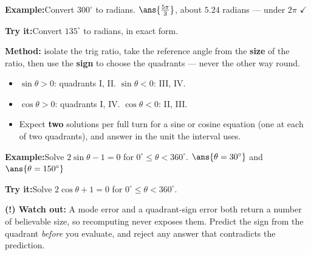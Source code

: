 \documentclass[12pt]{article}
\begin{document}
\begin{examplebox}
\textbf{Example:}\quad Convert $300^\circ$ to radians.
$\ans{\frac{5\pi}{3}}$, about $5.24$ radians --- under $2\pi$ $\checkmark$
\end{examplebox}

\begin{tryitbox}
\textbf{Try it:}\quad Convert $135^\circ$ to radians, in exact form.\\[2pt]
\end{tryitbox}


\begin{formulabox}
\textbf{Method:} isolate the trig ratio, take the reference angle from the
\textbf{size} of the ratio, then use the \textbf{sign} to choose the quadrants ---
never the other way round.
\begin{itemize}[leftmargin=0.8cm, itemsep=1pt, topsep=2pt]
  \item $\sin\theta > 0$: quadrants I, II. \quad $\sin\theta < 0$: III, IV.
  \item $\cos\theta > 0$: quadrants I, IV. \quad $\cos\theta < 0$: II, III.
  \item Expect \textbf{two} solutions per full turn for a sine or cosine equation
        (one at each of two quadrants), and answer in the unit the interval uses.
\end{itemize}
\end{formulabox}

\begin{examplebox}
\textbf{Example:}\quad Solve $2\sin\theta - 1 = 0$ for
$0^\circ \le \theta < 360^\circ$.
$\ans{\theta = 30^\circ}$ and $\ans{\theta = 150^\circ}$
\end{examplebox}

\begin{tryitbox}
\textbf{Try it:}\quad Solve $2\cos\theta + 1 = 0$ for
$0^\circ \le \theta < 360^\circ$.\\[2pt]
\end{tryitbox}

\begin{watchoutbox}
\textbf{(!) Watch out:} A mode error and a quadrant-sign error both return a
number of believable size, so recomputing never exposes them. Predict the sign
from the quadrant \emph{before} you evaluate, and reject any answer that
contradicts the prediction.
\end{watchoutbox}
\end{document}
